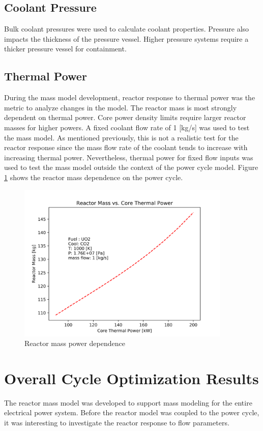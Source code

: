 \subsection{Coolant Pressure}
Bulk coolant pressures were used to calculate coolant properties. Pressure also
impacts the thickness of the pressure vessel. Higher pressure systems require a
thicker pressure vessel for containment.

\subsection{Thermal Power}
During the mass model development, reactor response to thermal power was the
metric to analyze changes in the model. The reactor mass is most strongly
dependent on thermal power. Core power density limits require larger reactor
masses for higher powers. A fixed coolant flow rate of 1 [kg/s] was used to test
the mass model. As mentioned previously, this is not a realistic test for the
reactor response since the mass flow rate of the coolant tends to increase with
increasing thermal power. Nevertheless, thermal power for fixed flow inputs was
used to test the mass model outside the context of the power cycle model. Figure
\ref{fig:mass_vs_q_uo2_co2} shows the reactor mass dependence on the power
cycle.

\begin{figure}[h]
    \centering
    \includegraphics[width=4in]{../images/mass_vs_q_uo2_co2.png}
\caption{Reactor mass power dependence}
\label{fig:mass_vs_q_uo2_co2}
\end{figure}

\section{Overall Cycle Optimization Results}
The reactor mass model was developed to support mass modeling for the entire
electrical power system. Before the reactor model was coupled to the power
cycle, it was interesting to investigate the reactor response to flow
parameters.

